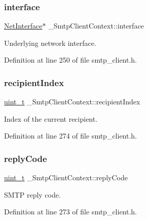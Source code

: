 \subsubsection{\texorpdfstring{interface}{interface}}
{\footnotesize\ttfamily \hyperlink{net_8h_a2234db8911a1148c9159979d8f5e0d6b}{Net\+Interface}$\ast$ \+\_\+\+Smtp\+Client\+Context\+::interface}



Underlying network interface. 



Definition at line 250 of file smtp\+\_\+client.\+h.

\mbox{\label{struct__SmtpClientContext_a733bd5d651b06a123f941d864caacf89}} 
\subsubsection{\texorpdfstring{recipient\+Index}{recipientIndex}}
{\footnotesize\ttfamily \hyperlink{compiler__port_8h_a12a1e9b3ce141648783a82445d02b58d}{uint\+\_\+t} \+\_\+\+Smtp\+Client\+Context\+::recipient\+Index}



Index of the current recipient. 



Definition at line 274 of file smtp\+\_\+client.\+h.

\mbox{\label{struct__SmtpClientContext_aab1f5c5a03c3f5ba832af9284b1a87ca}} 
\subsubsection{\texorpdfstring{reply\+Code}{replyCode}}
{\footnotesize\ttfamily \hyperlink{compiler__port_8h_a12a1e9b3ce141648783a82445d02b58d}{uint\+\_\+t} \+\_\+\+Smtp\+Client\+Context\+::reply\+Code}



S\+M\+TP reply code. 



Definition at line 273 of file smtp\+\_\+client.\+h.

